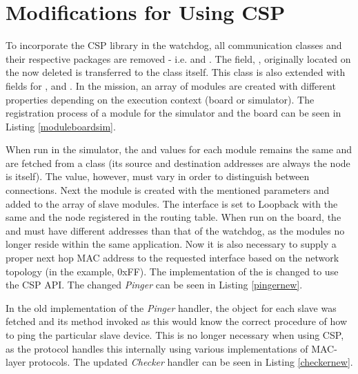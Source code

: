 \section{Modifications for Using CSP}
To incorporate the CSP library in the watchdog, all communication classes and their respective packages are removed - i.e.  and . The field, , originally located on the now deleted  is transferred to the  class itself. This class is also extended with fields for ,  and . In the mission, an array of modules are created with different properties depending on the execution context (board or simulator). The registration process of a module for the simulator and the board can be seen in Listing \ref{moduleboardsim}.



When run in the simulator, the  and  values for each module remains the same and are fetched from a  class (its source and destination addresses are always the node is itself). The  value, however, must vary in order to distinguish between connections. Next the module is created with the mentioned parameters and added to the array of slave modules. The interface is set to Loopback with the same  and the node registered in the routing table. When run on the board, the  and  must have different addresses than that of the watchdog, as the modules no longer reside within the same application. Now it is also necessary to supply a proper next hop MAC address to the requested interface based on the network topology (in the example, 0xFF). The implementation of the  is changed to use the CSP API. The changed \textit{Pinger} can be seen in Listing \ref{pingernew}.



In the old implementation of the \textit{Pinger} handler, the  object for each slave was fetched and its  method invoked as this would know the correct procedure of how to ping the particular slave device. This is no longer necessary when using CSP, as the protocol handles this internally using various implementations of MAC-layer protocols. The updated \textit{Checker} handler can be seen in Listing \ref{checkernew}.

